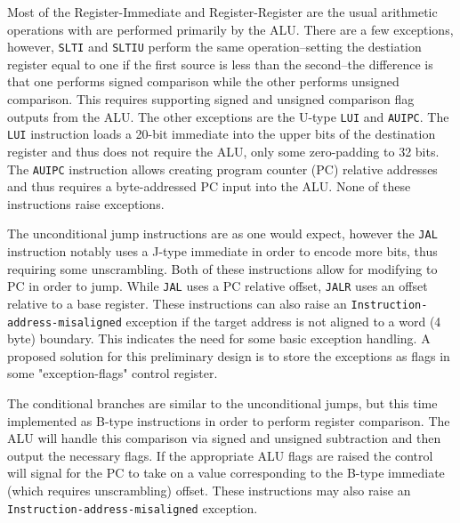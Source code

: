 \documentclass[lettersize,journal]{IEEEtran}
\begin{document}
Most of the Register-Immediate and Register-Register are the usual arithmetic operations with are performed primarily by the ALU.
There are a few exceptions, however, \verb|SLTI| and \verb|SLTIU| perform the same operation--setting the destiation register equal to one if the first source is less than the second--the difference is that one performs signed comparison while the other performs unsigned comparison.
This requires supporting signed and unsigned comparison flag outputs from the ALU.
The other exceptions are the U-type \verb|LUI| and \verb|AUIPC|.
The \verb|LUI| instruction loads a 20-bit immediate into the upper bits of the destination register and thus does not require the ALU, only some zero-padding to 32 bits.
The \verb|AUIPC| instruction allows creating program counter (PC) relative addresses and thus requires a byte-addressed PC input into the ALU.
None of these instructions raise exceptions.

The unconditional jump instructions are as one would expect, however the \verb|JAL| instruction notably uses a J-type immediate in order to encode more bits, thus requiring some unscrambling.
Both of these instructions allow for modifying to PC in order to jump. While \verb|JAL| uses a PC relative offset, \verb|JALR| uses an offset relative to a base register.
These instructions can also raise an \verb|Instruction-address-misaligned| exception if the target address is not aligned to a word (4 byte) boundary.
This indicates the need for some basic exception handling.
A proposed solution for this preliminary design is to store the exceptions as flags in some "exception-flags" control register.

The conditional branches are similar to the unconditional jumps, but this time implemented as B-type instructions in order to perform register comparison.
The ALU will handle this comparison via signed and unsigned subtraction and then output the necessary flags.
If the appropriate ALU flags are raised the control will signal for the PC to take on a value corresponding to the B-type immediate (which requires unscrambling) offset.
These instructions may also raise an \verb|Instruction-address-misaligned| exception.
\end{document}

